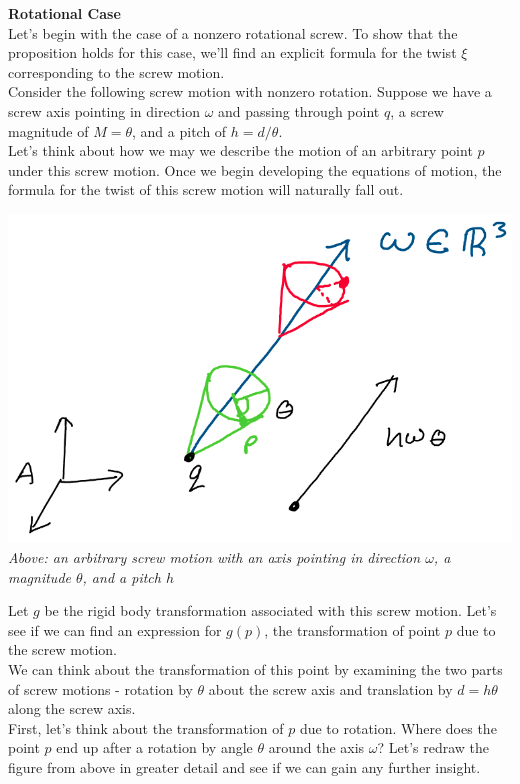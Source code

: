 \documentclass[oneside]{book}
\begin{document}
\textbf{Rotational Case}\\
Let's begin with the case of a nonzero rotational screw. To show that the proposition holds for this case, we'll find an explicit formula for the twist $\xi$ corresponding to the screw motion.\\
Consider the following screw motion with nonzero rotation. Suppose we have a screw axis pointing in direction $\omega$ and passing through point $q$, a screw magnitude of $M = \theta$, and a pitch of $h = d/\theta$.\\
Let's think about how we may we describe the motion of an arbitrary point $p$ under this screw motion. Once we begin developing the equations of motion, the formula for the twist of this screw motion will naturally fall out.
\begin{center}
    \includegraphics[scale=0.3]{images/screwMotionMath.png}\\
    \textit{Above: an arbitrary screw motion with an axis pointing in direction $\omega$, a magnitude $\theta$, and a pitch $h$}
\end{center}
Let $g$ be the rigid body transformation associated with this screw motion. Let's see if we can find an expression for $g(p)$, the transformation of point $p$ due to the screw motion.\\
We can think about the transformation of this point by examining the two parts of screw motions - rotation by $\theta$ about the screw axis and translation by $d = h\theta$ along the screw axis.\\
First, let's think about the transformation of $p$ due to rotation. Where does the point $p$ end up after a rotation by angle $\theta$ around the axis $\omega$? Let's redraw the figure from above in greater detail and see if we can gain any further insight.
\end{document}
